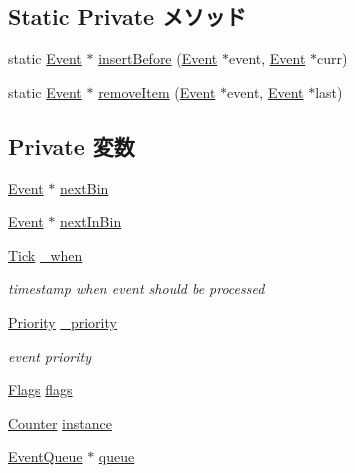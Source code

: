 \subsection*{Static Private メソッド}
\begin{DoxyCompactItemize}
\item 
static \hyperlink{classEvent}{Event} $\ast$ \hyperlink{classEvent_a67dc02b0253a9a268380268612a74b2c}{insertBefore} (\hyperlink{classEvent}{Event} $\ast$event, \hyperlink{classEvent}{Event} $\ast$curr)
\item 
static \hyperlink{classEvent}{Event} $\ast$ \hyperlink{classEvent_a3b97c26403aff54eb1a4e05de0124ea5}{removeItem} (\hyperlink{classEvent}{Event} $\ast$event, \hyperlink{classEvent}{Event} $\ast$last)
\end{DoxyCompactItemize}
\subsection*{Private 変数}
\begin{DoxyCompactItemize}
\item 
\hyperlink{classEvent}{Event} $\ast$ \hyperlink{classEvent_a31312157f348cb35f2532b4caa29f7f1}{nextBin}
\item 
\hyperlink{classEvent}{Event} $\ast$ \hyperlink{classEvent_a825f3555ba76a30dca432425e0901143}{nextInBin}
\item 
\hyperlink{base_2types_8hh_a5c8ed81b7d238c9083e1037ba6d61643}{Tick} \hyperlink{classEvent_a252ba7479c9d9519c6879cd5c297d54c}{\_\-when}
\begin{DoxyCompactList}\small\item\em timestamp when event should be processed \item\end{DoxyCompactList}\item 
\hyperlink{classEventBase_a6d92f7ee8144a5911ed46d85a89a4934}{Priority} \hyperlink{classEvent_a4c36d25baa2cdb3ae10202e51702b93d}{\_\-priority}
\begin{DoxyCompactList}\small\item\em event priority \item\end{DoxyCompactList}\item 
\hyperlink{classFlags}{Flags} \hyperlink{classEvent_aa991e2b209ef26272bf4fd920777bcda}{flags}
\item 
\hyperlink{base_2types_8hh_ae1475755791765b8e6f6a8bb091e273e}{Counter} \hyperlink{classEvent_a4e89167460bd110a598d62294485718b}{instance}
\item 
\hyperlink{classEventQueue}{EventQueue} $\ast$ \hyperlink{classEvent_a4c802add2830eb8f234f8dd788b4a588}{queue}
\end{DoxyCompactItemize}
